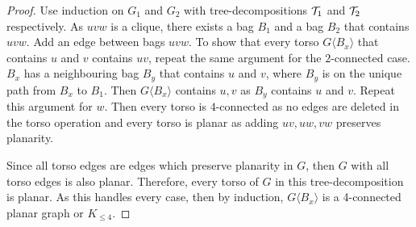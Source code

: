 \begin{proof}
	Use induction on $G_1$ and $G_2$ with tree-decompositions $\mathcal{T}_1$ and $\mathcal{T}_2$ respectively. As $uvw$ is a clique, there exists a bag $B_1$ and a bag $B_2$ that contains $uvw$. Add an edge between bags $uvw$. To show that every torso $G\langle B_x \rangle$ that contains $u$ and $v$ contains $uv$, repeat the same argument for the $2$-connected case. $B_x$ has a neighbouring bag $B_y$ that contains $u$ and $v$, where $B_y$ is on the unique path from $B_x$ to $B_1$. Then $G\langle B_x \rangle$ contains $u, v$ as $B_y$ contains $u$ and $v$. Repeat this argument for $w$. Then every torso is $4$-connected as no edges are deleted in the torso operation and every torso is planar as adding $uv, uw, vw$ preserves planarity. 

	Since all torso edges are edges which preserve planarity in $G$, then $G$ with all torso edges is also planar. Therefore, every torso of $G$ in this tree-decomposition is planar.
	As this handles every case, then by induction, $G \langle B_x \rangle$ is a 4-connected planar graph or $K_{\leq 4}$. 
\end{proof}